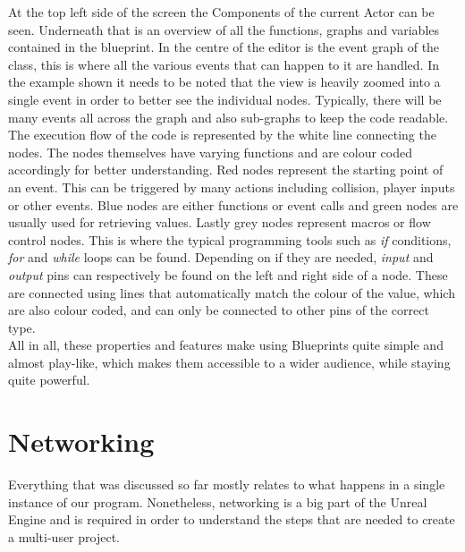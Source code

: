 At the top left side of the screen the Components of the current Actor can be seen. Underneath that is an overview of all the functions, graphs and variables contained in the blueprint. In the centre of the editor is the event graph of the class, this is where all the various events that can happen to it are handled. In the example shown it needs to be noted that the view is heavily zoomed into a single event in order to better see the individual nodes. Typically, there will be many events all across the graph and also sub-graphs to keep the code readable.\\
The execution flow of the code is represented by the white line connecting the nodes. The nodes themselves have varying functions and are colour coded accordingly for better understanding. Red nodes represent the starting point of an event. This can be triggered by many actions including collision, player inputs or other events. Blue nodes are either functions or event calls and green nodes are usually used for retrieving values. Lastly grey nodes represent macros or flow control nodes. This is where the typical programming tools such as \textit{if} conditions, \textit{for} and \textit{while} loops can be found.
Depending on if they are needed, \textit{input} and \textit{output} pins can respectively be found on the left and right side of a node. These are connected using lines that automatically match the colour of the value, which are also colour coded, and can only be connected to other pins of the correct type.\\
All in all, these properties and features make using Blueprints quite simple and almost play-like, which makes them accessible to a wider audience, while staying quite powerful.

\section{Networking}

Everything that was discussed so far mostly relates to what happens in a single instance of our program. Nonetheless, networking is a big part of the Unreal Engine and is required in order to understand the steps that are needed to create a multi-user project.\\


